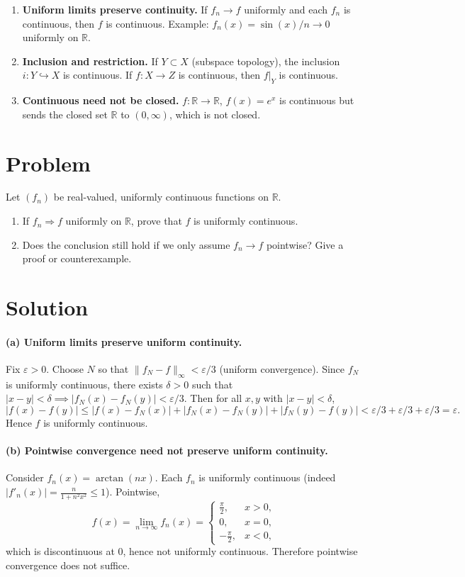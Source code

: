 \documentclass[12pt,a4paper]{article}
\begin{document}
\begin{enumerate}
	\item \textbf{Uniform limits preserve continuity.}
	If $f_n\to f$ uniformly and each $f_n$ is continuous, then $f$ is continuous.
	Example: $f_n(x)=\sin(x)/n\to 0$ uniformly on $\mathbb{R}$.
	
	\item \textbf{Inclusion and restriction.}
	If $Y\subset X$ (subspace topology), the inclusion $i:Y\hookrightarrow X$ is continuous.
	If $f:X\to Z$ is continuous, then $f|_Y$ is continuous.
	
	\item \textbf{Continuous need not be closed.}
	$f:\mathbb{R}\to\mathbb{R}$, $f(x)=e^x$ is continuous but sends the closed set $\mathbb{R}$ to $(0,\infty)$, which is not closed.
\end{enumerate}

\section*{Problem}
Let $(f_n)$ be real-valued, uniformly continuous functions on $\mathbb{R}$.
\begin{enumerate}[label=(\alph*)]
	\item If $f_n \Rightarrow f$ uniformly on $\mathbb{R}$, prove that $f$ is uniformly continuous.
	\item Does the conclusion still hold if we only assume $f_n \to f$ pointwise? Give a proof or counterexample.
\end{enumerate}

\section*{Solution}

\paragraph{(a) Uniform limits preserve uniform continuity.}
Fix $\varepsilon>0$. Choose $N$ so that $\|f_N-f\|_\infty<\varepsilon/3$ (uniform convergence).
Since $f_N$ is uniformly continuous, there exists $\delta>0$ such that
$|x-y|<\delta \implies |f_N(x)-f_N(y)|<\varepsilon/3$.
Then for all $x,y$ with $|x-y|<\delta$,
\[
|f(x)-f(y)|
\le |f(x)-f_N(x)| + |f_N(x)-f_N(y)| + |f_N(y)-f(y)|
< \varepsilon/3 + \varepsilon/3 + \varepsilon/3
= \varepsilon.
\]
Hence $f$ is uniformly continuous.

\paragraph{(b) Pointwise convergence need not preserve uniform continuity.}
Consider $f_n(x)=\arctan(n x)$. Each $f_n$ is uniformly continuous (indeed $|f'_n(x)|=\frac{n}{1+n^2x^2}\le 1$).
Pointwise,
\[
f(x)=\lim_{n\to\infty} f_n(x)=
\begin{cases}
	\frac{\pi}{2}, & x>0,\\
	0, & x=0,\\
	-\frac{\pi}{2}, & x<0,
\end{cases}
\]
which is discontinuous at $0$, hence not uniformly continuous. Therefore pointwise convergence does not suffice.
\end{document}
